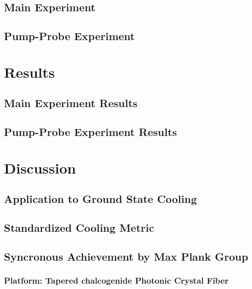   \subsection{Main Experiment}
  \label{subsec:Cooling:Setup:Main}
  \lipsum[1]

  \subsection{Pump-Probe Experiment}
  \label{subsec:Cooling:Setup:Pump-Probe}
  \lipsum[1]

\section{Results}
\label{sec:Cooling:Results}
\lipsum[1]

  \subsection{Main Experiment Results}
  \label{subsec:Cooling:Results:Main}
  \lipsum[1]

  \subsection{Pump-Probe Experiment Results}
  \label{subsec:Cooling:Results:Pump-Probe}
  \lipsum[1]

\section{Discussion}
\label{sec:Cooling:Discussion}
\lipsum[1]

  \subsection{Application to Ground State Cooling}
  \label{subsec:Cooling:Discussion:Ground-State}
  \lipsum[1]

  \subsection{Standardized Cooling Metric}
  \label{subsec:Cooling:Discussion:Metric}
  \lipsum[1]

  \subsection{Syncronous Achievement by Max Plank Group}
  \label{subsec:Cooling:Discussion:Max-Plank}
  \lipsum[1]

    \subsubsection{Platform: Tapered chalcogenide Photonic Crystal Fiber}
    \label{subsubsec:Cooling:Discussion:Max-Plank:PCF}
    \lipsum[1]
